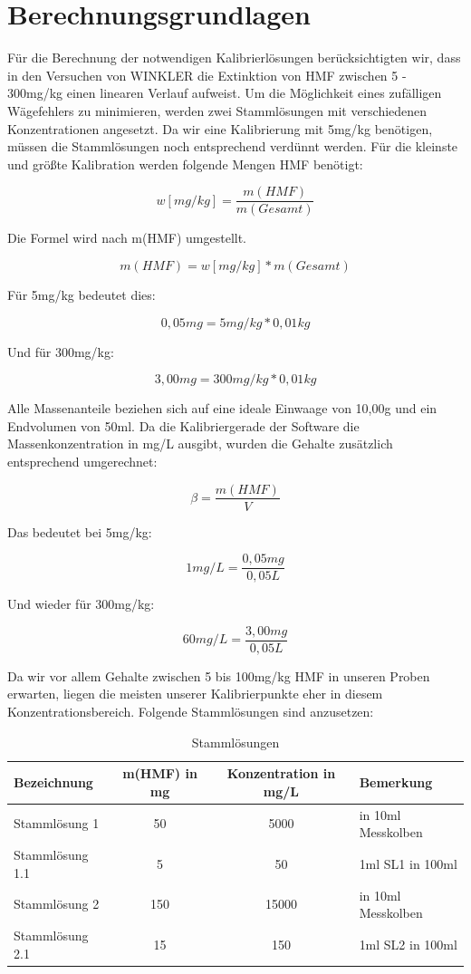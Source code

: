 \section{Berechnungsgrundlagen}
Für die Berechnung der notwendigen Kalibrierlösungen berücksichtigten wir, dass in den Versuchen von WINKLER die Extinktion von HMF zwischen 5 - 300mg/kg einen linearen Verlauf aufweist. Um die Möglichkeit eines zufälligen Wägefehlers zu minimieren, werden zwei Stammlösungen mit verschiedenen Konzentrationen angesetzt. Da wir eine Kalibrierung mit 5mg/kg benötigen, müssen die Stammlösungen noch entsprechend verdünnt werden. Für die kleinste und größte Kalibration werden folgende Mengen HMF benötigt:

	\[w[mg/kg]=\frac{ m(HMF) }{ m(Gesamt) }\]
	
Die Formel wird nach m(HMF) umgestellt.

	\[m(HMF)=w[mg/kg]*m(Gesamt)\]
	
Für 5mg/kg bedeutet dies:
	
	\[0,05mg=5mg/kg*0,01kg\]
	
Und für 300mg/kg:

	\[3,00mg=300mg/kg*0,01kg\]
	
Alle Massenanteile beziehen sich auf eine ideale Einwaage von 10,00g und ein Endvolumen von 50ml.
Da die Kalibriergerade der Software die Massenkonzentration in mg/L ausgibt, wurden die Gehalte zusätzlich entsprechend umgerechnet:

\[\beta=\frac{ m(HMF) }{ V }\]

Das bedeutet bei 5mg/kg:

\[1mg/L=\frac{ 0,05mg }{ 0,05L }\]

Und wieder für 300mg/kg:

\[60mg/L=\frac{ 3,00mg }{ 0,05L }\]

Da wir vor allem Gehalte zwischen 5 bis 100mg/kg HMF in unseren Proben erwarten, liegen die meisten unserer Kalibrierpunkte eher in diesem Konzentrationsbereich.
Folgende Stammlösungen sind anzusetzen:

\begin{table}[htbp]
	\centering
	\caption{Stammlösungen}
		\begin{tabular}{l|c|c|l}
			Bezeichnung & m(HMF) in mg & Konzentration in mg/L & Bemerkung\\
			\hline
			Stammlösung 1 & 50 & 5000  & in 10ml Messkolben\\
			\hline
			Stammlösung 1.1 & 5 & 50 & 1ml SL1 in 100ml\\
			\hline
			Stammlösung 2 & 150 & 15000 & in 10ml Messkolben\\
			\hline
			Stammlösung 2.1 & 15 & 150 & 1ml SL2 in 100ml\\
		\end{tabular}
		\label{tab:Stammlösungen}
\end{table}

